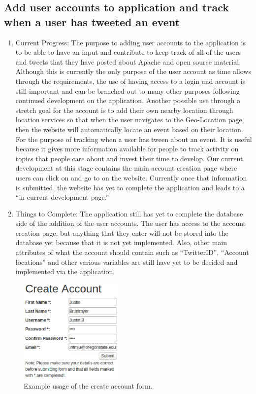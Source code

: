 \documentclass[letterpaper,10pt,onecolumn]{IEEEtran} %
\begin{document}
\subsection{Add user accounts to application and track when a user has tweeted an event}
\begin{enumerate}[label*=\arabic*.]
\item Current Progress: The purpose to adding user accounts to the application is to be able to have an input and contribute to keep track of all of the users and tweets that they have posted about Apache and open source material. Although this is currently the only purpose of the user account as time allows through the requirements, the use of having access to a login and account is still important and can be branched out to many other purposes following continued development on the application. Another possible use through a stretch goal for the account is to add their own nearby location through location services so that when the user navigates to the Geo-Location page, then the website will automatically locate an event based on their location. For the purpose of tracking when a user has tween about an event. It is useful because it gives more information available for people to track activity on topics that people care about and invest their time to develop. Our current development at this stage contains the main account creation page where users can click on and go to on the website. Currently once that information is submitted, the website has yet to complete the application and leads to a “in current development page.”

\item Things to Complete: The application still has yet to complete the database side of the addition of the user accounts. The user has access to the account creation page, but anything that they enter will not be stored into the database yet because that it is not yet implemented. Also, other main attributes of what the account should contain such as “TwitterID”, “Account locations” and other various variables are still have yet to be decided and implemented via the application.
\end{enumerate}

\begin{figure}[htp]
  \begin{center}
  
  \includegraphics[width=2in]{createAccountForm}
  \centering
  \caption{Example usage of the create account form. }

  \end{center}
\end{figure}
\end{document}
